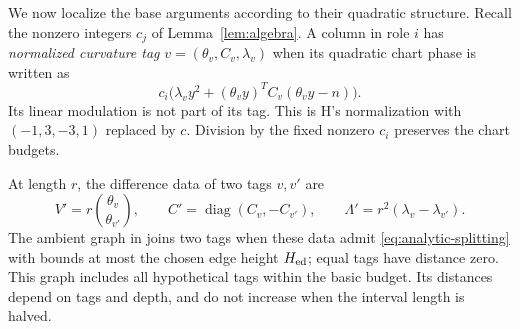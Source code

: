We now localize the base arguments according to their quadratic
structure.  Recall the nonzero integers \(c_j\) of
Lemma~\ref{lem:algebra}.  A column in role \(i\) has
\emph{normalized curvature tag} \(v=(\theta_v,C_v,\lambda_v)\)
when its quadratic chart phase is written as
\[
 c_i\bigl(\lambda_v y^2+(\theta_vy)^TC_v(\theta_vy-n)\bigr).
\]
Its linear modulation is not part of its tag.  This is H's
normalization with \((-1,3,-3,1)\) replaced by \(c\).  Division by
the fixed nonzero \(c_i\) preserves the chart budgets.

At length \(r\), the difference data of two tags \(v,v'\) are
\begin{equation}
 V'=r\binom{\theta_v}{\theta_{v'}},\qquad
 C'=\operatorname{diag}(C_v,-C_{v'}),\qquad
 \Lambda'=r^2(\lambda_v-\lambda_{v'}).
 \label{eq:analytic-tag-difference}
\end{equation}
The ambient graph in \cite[Section~6.1]{H} joins two tags when these
data admit \eqref{eq:analytic-splitting} with bounds at most the
chosen edge height \(H_{\rm ed}\); equal tags have distance zero.
This graph includes all hypothetical tags within the basic budget.
Its distances depend on tags and depth, and do not increase when
the interval length is halved.

